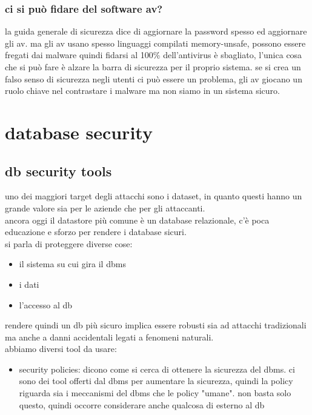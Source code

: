 \documentclass[12pt, oneside]{extbook} %
\begin{document}
\subsection{ci si può fidare del software av?}
la guida generale di sicurezza dice di aggiornare la password spesso ed aggiornare gli av. ma gli av usano spesso linguaggi compilati memory-unsafe, possono essere fregati dai malware quindi fidarsi al 100\% dell'antivirus è sbagliato, l'unica cosa che si può fare è alzare la barra di sicurezza per il proprio sistema. se si crea un falso senso di sicurezza negli utenti ci può essere un problema, gli av giocano un ruolo chiave nel contrastare i malware ma non siamo in un sistema sicuro.

\chapter{database security}

\section{db security tools}
uno dei maggiori target degli attacchi sono i dataset, in quanto questi hanno un grande valore sia per le aziende che per gli attaccanti.\\ancora oggi il datastore più comune è un database relazionale, c'è poca educazione e sforzo per rendere i database sicuri.\\si parla di proteggere diverse cose:
\begin{itemize}
	\item il sistema su cui gira il dbms
	\item i dati
	\item l'accesso al db
\end{itemize}
rendere quindi un db più sicuro implica essere robusti sia ad attacchi tradizionali ma anche a danni accidentali legati a fenomeni naturali.\\abbiamo diversi tool da usare:
\begin{itemize}
	\item security policies: dicono come si cerca di ottenere la sicurezza del dbms. ci sono dei tool offerti dal dbms per aumentare la sicurezza, quindi la policy riguarda sia i meccanismi del dbms che le policy "umane". non basta solo questo, quindi occorre considerare anche qualcosa di esterno al db
\end{itemize}
\end{document}
